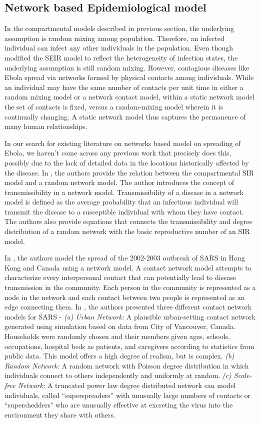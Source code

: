 \documentclass[10pt, journal,onecolumn]{IEEEtran}
\begin{document}
\subsection{{Network based Epidemiological model}}

In the compartmental models described in previous section, the underlying assumption is random
mixing among population. Therefore, an infected individual can infect any other individuals in the
population. Even though \citep{legrand2007understanding} modified the SEIR model to reflect the
heterogeneity of infection states, the underlying assumption is still random mixing. However,
contagious diseases like Ebola spread via networks formed by physical contacts among individuals.
While an individual may have the same number of contacts per unit time in either a random mixing
model or a network contact model, within a static network model the set of contacts is fixed, versus
a random-mixing model wherein it is continually changing. A static network model thus captures the
permanence of many human relationships.

In our search for existing literature on networks based model on spreading of Ebola, we haven't come
across any previous work that precisely does this, possibly due to the lack of detailed data in the
locations historically affected by the disease.  In \citep{newman2002spread}, the authors provide
the relation between the compartmental SIR model and a random network model. The author introduces
the concept of transmissibility in a network model. Transmissibility of a disease in a network model
is defined as the average probability that an infectious individual will transmit the disease to a
susceptible individual with whom they have contact. The authors also provide equations that connects
the transmissibility and degree distribution of a random network with the basic reproductive number
of an SIR model.

In \citep{meyers2005network}, the authors model the spread of the 2002-2003 outbreak of SARS in Hong
Kong and Canada using a network model. A contact network model attempts to characterize every
interpersonal contact that can potentially lead to disease transmission in the community. Each
person in the community is represented as a node in the network and each contact between two people
is represented as an edge connecting them. In \citep{meyers2005network}, the authors presented three
different contact network models for SARS -  \textit{(a) Urban Network:} A plausible urban-setting
contact network generated using simulation based on data from City of Vancouver, Canada. Households
were randomly chosen and  their members given ages, schools, occupations, hospital beds as patients,
and  caregivers according to statistics from public data.  This model offers a high degree of
realism, but is complex. \textit{(b) Random Network:} A random network with Poisson degree
distribution in which individuals connect to others independently and uniformly at random.
\textit{(c) Scale-free Network:}  A truncated power law degree distributed network can model
individuals, called ``superspreaders'' with unusually large numbers of contacts or ``supershedders"
who are unusually effective at excreting the virus into the environment they share with others.
\end{document}
